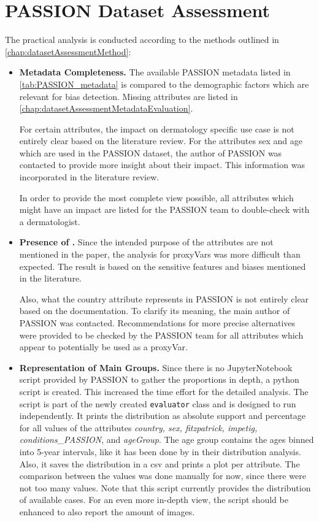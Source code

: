 \documentclass[12pt, a4paper, oneside]{book}   	%
\begin{document}
			
		\section{PASSION Dataset Assessment} \label{chap:datasetAssessmentExecution}
		The practical analysis is conducted according to the methods outlined in \autoref{chap:datasetAssessmentMethod}:
		
		\begin{itemize}
			\item \textbf{Metadata Completeness.}
			The available PASSION metadata listed in \autoref{tab:PASSION_metadata} is compared to the demographic factors which are relevant for bias detection. Missing attributes are listed in \autoref{chap:datasetAssessmentMetadataEvaluation}.
			
			For certain attributes, the impact on dermatology specific use case is not entirely clear based on the literature review. For the attributes sex and age which are used in the PASSION dataset, the author of PASSION was contacted to provide more insight about their impact. This information was incorporated in the literature review.
			
			In order to provide the most complete view possible, all attributes which might have an impact are listed for the PASSION team to double-check with a dermatologist.
			
			\item \textbf{Presence of .}
			Since the intended purpose of the attributes are not mentioned in the paper, the analysis for \glspl{proxyVar} was more difficult than expected. The result is based on the sensitive features and biases mentioned in the literature.
			
			Also, what the country attribute represents in PASSION is not entirely clear based on the documentation. To clarify its meaning, the main author of PASSION was contacted. Recommendations for more precise alternatives were provided to be checked by the PASSION team for all attributes which appear to potentially be used as a \gls{proxyVar}.
			
			\item \textbf{Representation of Main Groups.}
			Since there is no \gls{JupyterNotebook} script provided by PASSION to gather the proportions in depth, a python script is created. This increased the time effort for the detailed analysis. The script is part of the newly created \texttt{evaluator} class and is designed to run independently.
			It prints the distribution as absolute support and percentage for all values of the attributes \textit{country, sex, fitzpatrick, impetig, conditions\_PASSION}, and \textit{ageGroup}. The age group contains the ages binned into 5-year intervals, like it has been done by \textcite{Gottfrois2024} in their distribution analysis.
			Also, it saves the distribution in a csv and prints a plot per attribute. The comparison between the values was done manually for now, since there were not too many values.
			Note that this script currently provides the distribution of available cases. For an even more in-depth view, the script should be enhanced to also report the amount of images.
			

\end{itemize}
\end{document}
